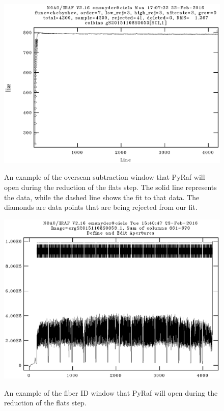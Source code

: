 \documentclass[12pt]{report}
\begin{document}
\begin{figure}[h]
\centering
\includegraphics{overscan_example.eps}
\label{fig:overscan}
\caption[Overscan Subtraction Example]{An example of the overscan subtraction window that PyRaf will open during the reduction of the flats step. The solid line represents the data, while the dashed line shows the fit to that data. The diamonds are data points that are being rejected from our fit.}
\end{figure}

\begin{figure}[h]
\centering
\includegraphics{apertures1.eps}
\label{fig:ap1}
\caption[Zoomed Out Fiber ID Example]{An example of the fiber ID window that PyRaf will open during the reduction of the flats step.}
\end{figure}
\end{document}
